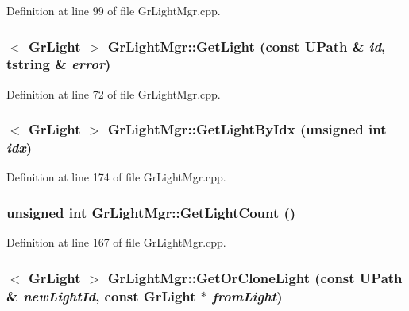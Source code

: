 Definition at line 99 of file GrLightMgr.cpp.\hypertarget{class_gr_light_mgr_6e2d2113c8d6092935f4f39ad9e1388d}{
\subsubsection[{GetLight}]{$<$ {\bf GrLight} $>$ GrLightMgr::GetLight (const {\bf UPath} \& {\em id}, \/  {\bf tstring} \& {\em error})}}
\label{class_gr_light_mgr_6e2d2113c8d6092935f4f39ad9e1388d}




Definition at line 72 of file GrLightMgr.cpp.\hypertarget{class_gr_light_mgr_202866b0eedfe24b2b89a74559d32e9d}{
\subsubsection[{GetLightByIdx}]{$<$ {\bf GrLight} $>$ GrLightMgr::GetLightByIdx (unsigned int {\em idx})}}
\label{class_gr_light_mgr_202866b0eedfe24b2b89a74559d32e9d}




Definition at line 174 of file GrLightMgr.cpp.\hypertarget{class_gr_light_mgr_550cba35490e5bc82c59cbd314867b34}{
\subsubsection[{GetLightCount}]{\setlength{\rightskip}{0pt plus 5cm}unsigned int GrLightMgr::GetLightCount ()}}
\label{class_gr_light_mgr_550cba35490e5bc82c59cbd314867b34}




Definition at line 167 of file GrLightMgr.cpp.\hypertarget{class_gr_light_mgr_24933a06e2f523461e064a3931c9f49f}{
\subsubsection[{GetOrCloneLight}]{$<$ {\bf GrLight} $>$ GrLightMgr::GetOrCloneLight (const {\bf UPath} \& {\em newLightId}, \/  const {\bf GrLight} $\ast$ {\em fromLight})}}
\label{class_gr_light_mgr_24933a06e2f523461e064a3931c9f49f}




